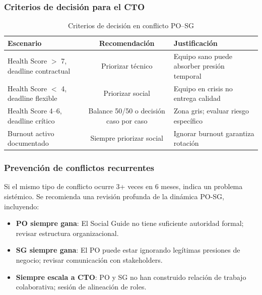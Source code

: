 \subsubsection{Criterios de decisión para el CTO}

\begin{table}[h]
    \centering
    \small
    \begin{tabularx}{\textwidth}{|X|c|X|}
        \hline
        \textbf{Escenario} & \textbf{Recomendación}                      & \textbf{Justificación} \\
        \hline
        Health Score $>$ 7, deadline contractual
                           & Priorizar técnico
                           & Equipo sano puede absorber presión temporal                          \\
        \hline
        Health Score $<$ 4, deadline flexible
                           & Priorizar social
                           & Equipo en crisis no entrega calidad                                  \\
        \hline
        Health Score 4--6, deadline crítico
                           & Balance 50/50 o decisión caso por caso
                           & Zona gris; evaluar riesgo específico                                 \\
        \hline
        Burnout activo documentado
                           & Siempre priorizar social
                           & Ignorar burnout garantiza rotación                                   \\
        \hline
    \end{tabularx}
    \caption{Criterios de decisión en conflicto PO--SG}
    \label{tab:criterios-conflicto}
\end{table}
\FloatBarrier

\subsubsection{Prevención de conflictos recurrentes}

Si el mismo tipo de conflicto ocurre 3+ veces en 6 meses, indica un problema sistémico. Se recomienda una revisión profunda de la dinámica PO-SG, incluyendo:

\begin{itemize}
    \item \textbf{PO siempre gana}: El Social Guide no tiene suficiente autoridad formal; revisar estructura organizacional.
    \item \textbf{SG siempre gana}: El PO puede estar ignorando legítimas presiones de negocio; revisar comunicación con stakeholders.
    \item \textbf{Siempre escala a CTO}: PO y SG no han construido relación de trabajo colaborativa; sesión de alineación de roles.
\end{itemize}

